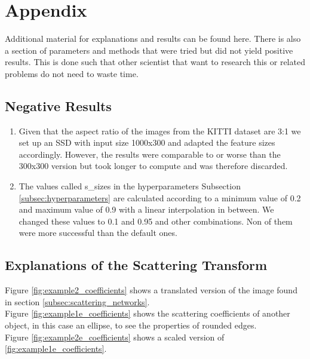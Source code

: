 \chapter{Appendix}
\label{chap:appendix}

Additional material for explanations and results can be found here. There is also a section of parameters and methods that were tried but did not yield positive results. This is done such that other scientist that want to research this or related problems do not need to waste time. 

\section{Negative Results}
\label{sec:stuff_that_did_not_work}

\begin{enumerate}
	\item Given that the aspect ratio of the images from the KITTI dataset are 3:1 we set up an SSD with input size 1000x300 and adapted the feature sizes accordingly. However, the results were comparable to or worse than the 300x300 version but took longer to compute and was therefore discarded.
	\item The values called s\_sizes in the hyperparameters Subsection \ref{subsec:hyperparameters} are calculated according to a minimum value of 0.2 and maximum value of 0.9 with a linear interpolation in between. We changed these values to 0.1 and 0.95 and other combinations. Non of them were more successful than the default ones.
\end{enumerate}

\section{Explanations of the Scattering Transform}

Figure \ref{fig:example2_coefficients} shows a translated version of the image found in section \ref{subsec:scattering_networks}. \\
Figure \ref{fig:example1e_coefficients} shows the scattering coefficients of another object, in this case an ellipse, to see the properties of rounded edges. \\
Figure \ref{fig:example2e_coefficients} shows a scaled version of \ref{fig:example1e_coefficients}. 

